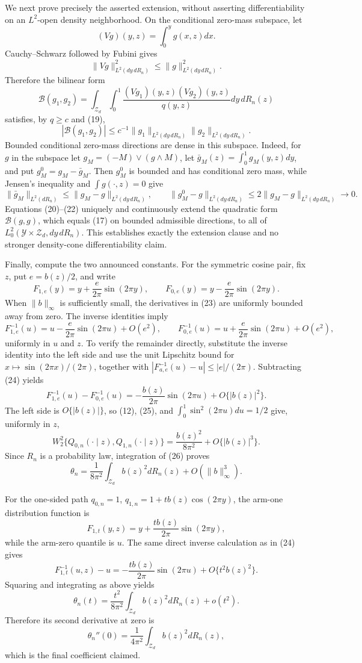 We next prove precisely the asserted extension, without asserting differentiability on an \(L^2\)-open density neighborhood.  On the conditional zero-mass subspace, let
\[
(Vg)(y,z)=\int_0^yg(x,z)dx.
\tag{18}
\]
Cauchy--Schwarz followed by Fubini gives
\[
\|Vg\|_{L^2(dy\,dR_n)}^2
\le \|g\|_{L^2(dy\,dR_n)}^2.
\tag{19}
\]
Therefore the bilinear form
\[
\mathcal B(g_1,g_2)
=\int_{\mathcal Z_d}\int_0^1
  \frac{(Vg_1)(y,z)(Vg_2)(y,z)}{q(y,z)}dy\,dR_n(z)
\tag{20}
\]
satisfies, by \(q\ge c\) and (19),
\[
|\mathcal B(g_1,g_2)|
\le c^{-1}\|g_1\|_{L^2(dy\,dR_n)}
              \|g_2\|_{L^2(dy\,dR_n)}.
\tag{21}
\]
Bounded conditional zero-mass directions are dense in this subspace.  Indeed, for \(g\) in the subspace let \(g_M=(-M)\vee(g\wedge M)\), let \(\bar g_M(z)=\int_0^1g_M(y,z)dy\), and put \(g_M^0=g_M-\bar g_M\).  Then \(g_M^0\) is bounded and has conditional zero mass, while Jensen's inequality and \(\int g(\cdot,z)=0\) give
\[
\|\bar g_M\|_{L^2(dR_n)}
\le\|g_M-g\|_{L^2(dy\,dR_n)},
\qquad
\|g_M^0-g\|_{L^2(dy\,dR_n)}
\le2\|g_M-g\|_{L^2(dy\,dR_n)}\to0.
\tag{22}
\]
Equations (20)--(22) uniquely and continuously extend the quadratic form \(\mathcal B(g,g)\), which equals (17) on bounded admissible directions, to all of \(L_0^2(\mathcal Y\times\mathcal Z_d,dy\,dR_n)\).  This establishes exactly the extension clause and no stronger density-cone differentiability claim.

Finally, compute the two announced constants.  For the symmetric cosine pair, fix \(z\), put \(e=b(z)/2\), and write
\[
F_{1,e}(y)=y+\frac{e}{2\pi}\sin(2\pi y),
\qquad
F_{0,e}(y)=y-\frac{e}{2\pi}\sin(2\pi y).
\tag{23}
\]
When \(\|b\|_{\infty}\) is sufficiently small, the derivatives in (23) are uniformly bounded away from zero.  The inverse identities imply
\[
F_{1,e}^{-1}(u)
=u-\frac{e}{2\pi}\sin(2\pi u)+O(e^2),
\qquad
F_{0,e}^{-1}(u)
=u+\frac{e}{2\pi}\sin(2\pi u)+O(e^2),
\tag{24}
\]
uniformly in \(u\) and \(z\).  To verify the remainder directly, substitute the inverse identity into the left side and use the unit Lipschitz bound for \(x\mapsto\sin(2\pi x)/(2\pi)\), together with \(|F_{a,e}^{-1}(u)-u|\le |e|/(2\pi)\).  Subtracting (24) yields
\[
F_{1,e}^{-1}(u)-F_{0,e}^{-1}(u)
=-\frac{b(z)}{2\pi}\sin(2\pi u)+O\{|b(z)|^2\}.
\tag{25}
\]
The left side is \(O\{|b(z)|\}\), so (12), (25), and \(\int_0^1\sin^2(2\pi u)du=1/2\) give, uniformly in \(z\),
\[
W_2^2\{Q_{0,n}(\cdot\mid z),Q_{1,n}(\cdot\mid z)\}
=\frac{b(z)^2}{8\pi^2}+O\{|b(z)|^3\}.
\tag{26}
\]
Since \(R_n\) is a probability law, integration of (26) proves
\[
\theta_n
=\frac{1}{8\pi^2}\int_{\mathcal Z_d}b(z)^2dR_n(z)
 +O(\|b\|_{\infty}^3).
\tag{27}
\]

For the one-sided path \(q_{0,n}=1\), \(q_{1,n}=1+t b(z)\cos(2\pi y)\), the arm-one distribution function is
\[
F_{1,t}(y,z)=y+\frac{t b(z)}{2\pi}\sin(2\pi y),
\tag{28}
\]
while the arm-zero quantile is \(u\).  The same direct inverse calculation as in (24) gives
\[
F_{1,t}^{-1}(u,z)-u
=-\frac{t b(z)}{2\pi}\sin(2\pi u)+O\{t^2b(z)^2\}.
\tag{29}
\]
Squaring and integrating as above yields
\[
\theta_n(t)
=\frac{t^2}{8\pi^2}\int_{\mathcal Z_d}b(z)^2dR_n(z)+o(t^2).
\tag{30}
\]
Therefore its second derivative at zero is
\[
\theta_n''(0)=\frac{1}{4\pi^2}
\int_{\mathcal Z_d}b(z)^2dR_n(z),
\tag{31}
\]
which is the final coefficient claimed.